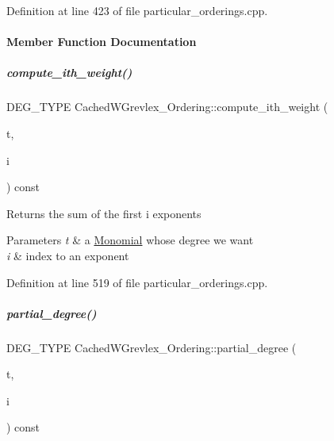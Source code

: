 Definition at line 423 of file particular\+\_\+orderings.\+cpp.



\paragraph{Member Function Documentation}
\mbox{\label{group__orderinggroup_a960a5b3460c4cab0dfd89bc0663c6ee0}} 
\subparagraph{\texorpdfstring{compute\+\_\+ith\+\_\+weight()}{compute\_ith\_weight()}}
{\footnotesize\ttfamily D\+E\+G\+\_\+\+T\+Y\+PE Cached\+W\+Grevlex\+\_\+\+Ordering\+::compute\+\_\+ith\+\_\+weight (\begin{DoxyParamCaption}\item[{const \hyperlink{group__polygroup_class_monomial}{Monomial} \&}]{t,  }\item[{N\+V\+A\+R\+\_\+\+T\+Y\+PE}]{i }\end{DoxyParamCaption}) const}

\begin{DoxyReturn}{Returns}
the sum of the first i exponents 
\end{DoxyReturn}

\begin{DoxyParams}{Parameters}
{\em t} & a \hyperlink{group__polygroup_class_monomial}{Monomial} whose degree we want \\
\hline
{\em i} & index to an exponent \\
\hline
\end{DoxyParams}


Definition at line 519 of file particular\+\_\+orderings.\+cpp.

\mbox{\label{group__orderinggroup_af04f39af33cba2c1c4f985e57ea8d136}} 
\subparagraph{\texorpdfstring{partial\+\_\+degree()}{partial\_degree()}}
{\footnotesize\ttfamily D\+E\+G\+\_\+\+T\+Y\+PE Cached\+W\+Grevlex\+\_\+\+Ordering\+::partial\+\_\+degree (\begin{DoxyParamCaption}\item[{const \hyperlink{group__polygroup_class_monomial}{Monomial} \&}]{t,  }\item[{N\+V\+A\+R\+\_\+\+T\+Y\+PE}]{i }\end{DoxyParamCaption}) const\hspace{0.3cm}{\ttfamily [inline]}}

